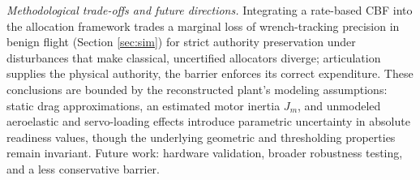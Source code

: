 \documentclass[letter, 10 pt, journal, twoside]{IEEEtran}
\theoremstyle{compact}
\begin{document}
\emph{Methodological trade-offs and future directions.}
Integrating a rate-based \ac{CBF} into the allocation framework trades a marginal loss of wrench-tracking precision in benign flight (Section \ref{sec:sim}) for strict authority preservation under disturbances that make classical, uncertified allocators diverge; articulation supplies the physical authority, the barrier enforces its correct expenditure. These conclusions are bounded by the reconstructed plant's modeling assumptions: static drag approximations, an estimated motor inertia $J_m$, and unmodeled aeroelastic and servo-loading effects introduce parametric uncertainty in absolute readiness values, though the underlying geometric and thresholding properties remain invariant. Future work: hardware validation, broader robustness testing, and a less conservative barrier.






\end{document}
